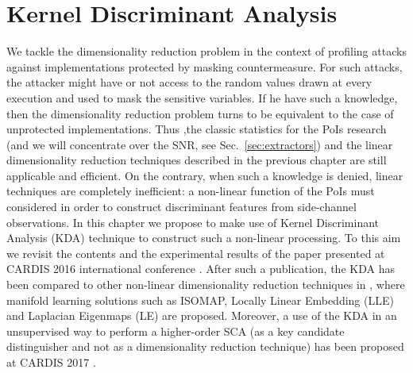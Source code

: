 
\chapter{Kernel Discriminant Analysis} %
\label{ChapterKernel}

We tackle the dimensionality reduction problem in the context of profiling attacks against implementations protected by masking countermeasure. For such attacks, the attacker might have or not access to the  random values drawn at every execution and used to mask the sensitive variables. If he have such a knowledge, then the dimensionality reduction problem turns to be equivalent to the case of unprotected implementations. Thus ,the classic statistics for the PoIs research (and we will concentrate over the SNR, see Sec.~\ref{sec:extractors}) and the linear dimensionality reduction techniques described in the previous chapter are still applicable and efficient. On the contrary, when such a knowledge is denied, linear techniques are completely inefficient: a non-linear function of the PoIs must considered in order to construct discriminant features from side-channel observations. In this chapter we propose to make use of Kernel Discriminant Analysis (KDA) technique to construct such a non-linear processing. To this aim we revisit the contents and the experimental results of the paper presented at CARDIS 2016 international conference \cite{cagli2016kernel}. After such a publication, the KDA has been compared to other non-linear dimensionality reduction techniques in \cite{manifold}, where manifold learning solutions such as ISOMAP, Locally Linear Embedding (LLE) and Laplacian Eigenmaps (LE) are proposed. Moreover, a use of the KDA in an unsupervised way to perform a higher-order SCA (as a key candidate distinguisher and not as a dimensionality reduction technique) has been proposed at CARDIS 2017 \cite{zhou2017novel}.



